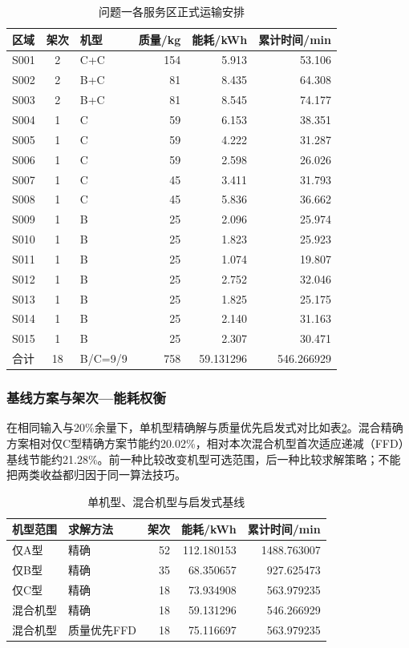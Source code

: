 \documentclass[withoutpreface,colorprint]{format}
\numberwithin{equation}{section}
\numberwithin{figure}{section}
\numberwithin{table}{section}
\begin{document}
\begin{table}[htbp]\centering\small
\caption{问题一各服务区正式运输安排}\label{tab:q1_area_plan}
\begin{tabular}{@{}lclrrr@{}}
\toprule
区域 & 架次 & 机型 & 质量/kg & 能耗/kWh & 累计时间/min\\
\midrule
S001 & 2 & C+C & 154 & 5.913 & 53.106\\
S002 & 2 & B+C & 81 & 8.435 & 64.308\\
S003 & 2 & B+C & 81 & 8.545 & 74.177\\
S004 & 1 & C & 59 & 6.153 & 38.351\\
S005 & 1 & C & 59 & 4.222 & 31.287\\
S006 & 1 & C & 59 & 2.598 & 26.026\\
S007 & 1 & C & 45 & 3.411 & 31.793\\
S008 & 1 & C & 45 & 5.836 & 36.662\\
S009 & 1 & B & 25 & 2.096 & 25.974\\
S010 & 1 & B & 25 & 1.823 & 25.923\\
S011 & 1 & B & 25 & 1.074 & 19.807\\
S012 & 1 & B & 25 & 2.752 & 32.046\\
S013 & 1 & B & 25 & 1.825 & 25.175\\
S014 & 1 & B & 25 & 2.140 & 31.163\\
S015 & 1 & B & 25 & 2.307 & 30.471\\
合计 & 18 & B/C=9/9 & 758 & 59.131296 & 546.266929\\
\bottomrule
\end{tabular}
\end{table}


\subsubsection{基线方案与架次—能耗权衡}
在相同输入与20\%余量下，单机型精确解与质量优先启发式对比如表\ref{tab:q1_baselines}。混合精确方案相对仅C型精确方案节能约20.02\%，相对本次混合机型首次适应递减（FFD）基线节能约21.28\%。前一种比较改变机型可选范围，后一种比较求解策略；不能把两类收益都归因于同一算法技巧。

\begin{table}[htbp]\centering\small
\caption{单机型、混合机型与启发式基线}\label{tab:q1_baselines}
\begin{tabular}{@{}llrrr@{}}
\toprule
机型范围 & 求解方法 & 架次 & 能耗/kWh & 累计时间/min\\
\midrule
仅A型 & 精确 & 52 & 112.180153 & 1488.763007\\
仅B型 & 精确 & 35 & 68.350657 & 927.625473\\
仅C型 & 精确 & 18 & 73.934908 & 563.979235\\
混合机型 & 精确 & 18 & 59.131296 & 546.266929\\
混合机型 & 质量优先FFD & 18 & 75.116697 & 563.979235\\
\bottomrule
\end{tabular}
\end{table}
\end{document}
